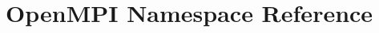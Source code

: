 \hypertarget{namespaceOpenMPI}{\section{Open\-M\-P\-I Namespace Reference}
\label{namespaceOpenMPI}
}
